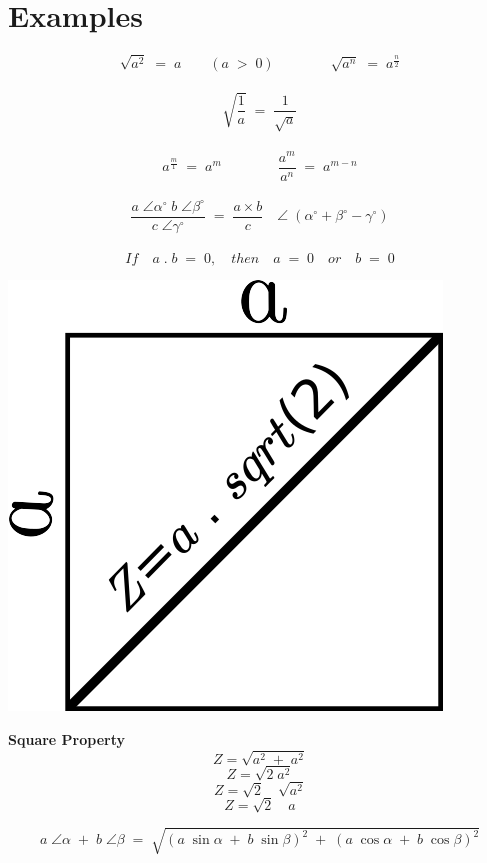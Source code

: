 \section{Examples}

\[\sqrt{a^2} \; = \; a \qquad (a \; > \; 0) \qquad \qquad \sqrt{a^n} \; = \; a^{\frac{n}{2}}\] \\
\[\sqrt{\frac{1}{a}} \; = \; \frac{1}{\sqrt{a}}\] \\
\[a^{\frac{m}{1}} \; = \; a^m \qquad \qquad \frac{a^m}{a^n} \; = \; a^{m-n}\] \\
\[\frac{a \; \angle \alpha^\circ \; b \; \angle \beta^\circ}{c \; \angle \gamma^\circ} \; = \; \frac{a \times b}{c} \quad \angle \; (\alpha^\circ + \beta^\circ - \gamma^\circ)\] \cite{book-12}
\\
\[If \quad a \; . \; b \; = \; 0, \quad then \quad a \; = \; 0 \quad or \quad b \; = \; 0\]
\emptyline
\begin{minipage}{0.60\linewidth}
	\includegraphics[scale=0.5]{./image/squareproperty.png}
\end{minipage}
\begin{minipage}[H]{0.3\linewidth}
	\textbf{Square Property} \\
	\[Z=\sqrt{a^2 \; + \; a^2}\]
	\[Z=\sqrt{2 \; a^2}\]
	\[Z=\sqrt{2} \quad \sqrt{a^2}\]
	\[Z=\sqrt{2} \quad a\]
\end{minipage}
\minipagespace{1cm}
\[a \; \angle \alpha \; + \; b \; \angle \beta \; = \; \sqrt{(a \;  \sin \alpha \; + \; b \; \sin \beta)^2 \; + \; (a \; \cos \alpha \; + \; b \; \cos \beta)^2}\] \\
